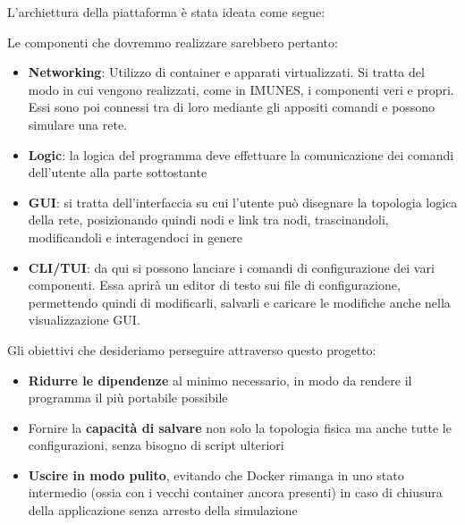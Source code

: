 L'archiettura della piattaforma è stata ideata come segue:

\begin{center}
\end{center}

Le componenti che dovremmo realizzare sarebbero pertanto:
\begin{itemize}
    \item \textbf{Networking}: Utilizzo di container e apparati virtualizzati. Si tratta del modo in cui vengono realizzati, come in IMUNES, i componenti veri e propri. Essi sono poi connessi tra di loro mediante gli appositi comandi e possono simulare una rete.
    \item \textbf{Logic}: la logica del programma deve effettuare la comunicazione dei comandi dell'utente alla parte sottostante
    \item \textbf{GUI}: si tratta dell'interfaccia su cui l'utente può disegnare la topologia logica della rete, posizionando quindi nodi e link tra nodi, trascinandoli, modificandoli e interagendoci in genere
    \item \textbf{CLI/TUI}: da qui si possono lanciare i comandi di configurazione dei vari componenti. Essa aprirà un editor di testo sui file di configurazione, permettendo quindi di modificarli, salvarli e caricare le modifiche anche nella visualizzazione GUI.
\end{itemize}
Gli obiettivi che desideriamo perseguire attraverso questo progetto:\begin{itemize}
    \item \textbf{Ridurre le dipendenze} al minimo necessario, in modo da rendere il programma il più portabile possibile
    \item Fornire la \textbf{capacità di salvare} non solo la topologia fisica ma anche tutte le configurazioni, senza bisogno di script ulteriori
    \item \textbf{Uscire in modo pulito}, evitando che Docker rimanga in uno stato intermedio (ossia con i vecchi container ancora presenti) in caso di chiusura della applicazione senza arresto della simulazione
\end{itemize}



\newpage
